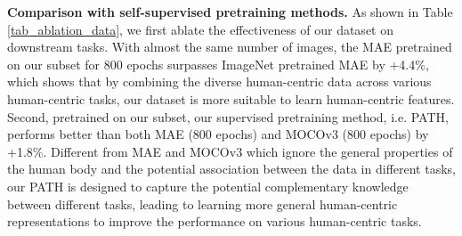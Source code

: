 \documentclass[10pt,twocolumn,letterpaper]{article}
\begin{document}
\begin{table}[t]
  \centering
  \caption{Comparison with self-supervised pretraining methods on ImageNet and the subset of our HumanBench. $\dag$ indicates the results are repoted as 1-heavy occluded MR$^{-2}$ for averaging.}
 \vspace{-1em}
 \label{tab_ablation_data}\end{table} 
\noindent \textbf{Comparison with self-supervised pretraining methods.} 
As shown in Table \ref{tab_ablation_data}, we first ablate the effectiveness of our dataset on downstream tasks. With almost the same number of images, the MAE pretrained on our subset for 800 epochs surpasses ImageNet pretrained MAE by +4.4\%, which shows that by combining the diverse human-centric data across various human-centric tasks, our dataset is more suitable to learn human-centric features. Second, pretrained on our subset, our supervised pretraining method, i.e. PATH, performs better than both MAE (800 epochs) and MOCOv3 (800 epochs) by +1.8\%. Different from MAE and MOCOv3 which ignore the general properties of the human body and the potential association between the data in different tasks, our PATH is designed to capture the potential complementary knowledge between different tasks, leading to learning more general human-centric representations to improve the performance on various human-centric tasks. 
\end{document}
